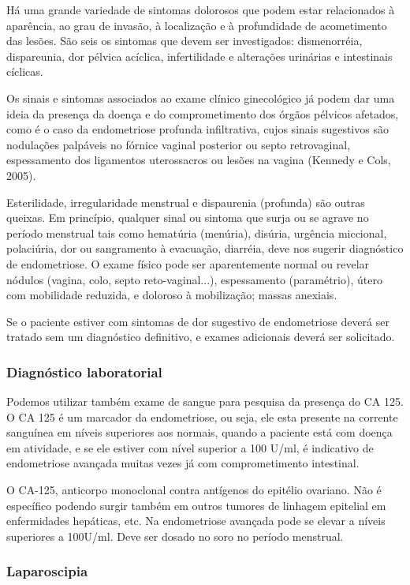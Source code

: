 \documentclass[12pt]{article} %
\begin{document}
Há uma grande variedade de sintomas dolorosos que podem estar relacionados à aparência, ao grau de invasão, à localização e à profundidade de acometimento das lesões. São seis os sintomas que devem ser investigados: dismenorréia, dispareunia, dor pélvica acíclica, infertilidade e alterações urinárias e intestinais cíclicas.

Os sinais e sintomas associados ao exame clínico ginecológico já podem dar uma ideia da presença da doença e do comprometimento dos órgãos pélvicos afetados, como é o caso da endometriose profunda infiltrativa, cujos sinais sugestivos são nodulações palpáveis no fórnice vaginal posterior ou septo retrovaginal, espessamento dos ligamentos uterossacros ou lesões na vagina (Kennedy e Cols, 2005).  

Esterilidade, irregularidade menstrual e dispaurenia (profunda) são outras queixas. Em princípio, qualquer sinal ou sintoma que surja ou se agrave no período menstrual tais como hematúria (menúria), disúria, urgência miccional, polaciúria, dor ou sangramento à evacuação, diarréia, deve nos sugerir diagnóstico de endometriose. O exame físico pode ser aparentemente normal ou revelar nódulos (vagina, colo, septo reto-vaginal...), espessamento (paramétrio), útero com mobilidade reduzida, e doloroso à mobilização; massas anexiais.

Se o paciente estiver com sintomas de dor sugestivo de endometriose deverá ser tratado sem um diagnóstico definitivo, e exames adicionais deverá ser solicitado.

 
\subsubsection{Diagnóstico laboratorial}

Podemos utilizar também exame de sangue para pesquisa da presença do CA 125. O CA 125 é um marcador da endometriose, ou seja, ele esta presente na corrente sanguínea em níveis superiores aos normais, quando a paciente está com doença em atividade, e se ele estiver com nível superior a 100 U/ml, é indicativo de endometriose avançada muitas vezes já com comprometimento intestinal. 

O CA-125, anticorpo monoclonal contra antígenos do epitélio ovariano. Não é específico podendo surgir também em outros tumores de linhagem epitelial em enfermidades hepáticas, etc. Na endometriose avançada pode se elevar a níveis superiores a 100U/ml. Deve ser dosado no soro no período menstrual.

\subsubsection{Laparoscipia}
\end{document}
